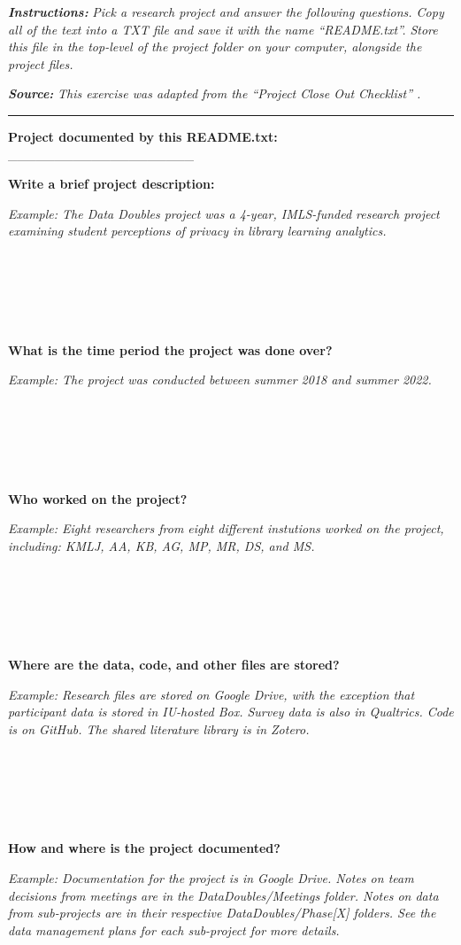 \documentclass[
]{book}
\begin{document}
\textbf{\emph{Instructions:}} \emph{Pick a research project and answer the following questions. Copy all of the text into a TXT file and save it with the name ``README.txt''. Store this file in the top-level of the project folder on your computer, alongside the project files.}

\textbf{\emph{Source:}} \emph{This exercise was adapted from the ``Project Close Out Checklist'' \citep{briney_project_2020}.}

\begin{center}\rule{0.5\linewidth}{0.5pt}\end{center}

\textbf{Project documented by this README.txt:} \_\_\_\_\_\_\_\_\_\_\_\_\_\_\_\_\_\_\_\_

\textbf{Write a brief project description:}

\emph{Example: The Data Doubles project was a 4-year, IMLS-funded research project examining student perceptions of privacy in library learning analytics.}

~

~

~

\textbf{What is the time period the project was done over?}

\emph{Example: The project was conducted between summer 2018 and summer 2022.}

~

~

~

\textbf{Who worked on the project?}

\emph{Example: Eight researchers from eight different instutions worked on the project, including: KMLJ, AA, KB, AG, MP, MR, DS, and MS.}

~

~

~

\textbf{Where are the data, code, and other files are stored?}

\emph{Example: Research files are stored on Google Drive, with the exception that participant data is stored in IU-hosted Box. Survey data is also in Qualtrics. Code is on GitHub. The shared literature library is in Zotero.}

~

~

~

\textbf{How and where is the project documented?}

\emph{Example: Documentation for the project is in Google Drive. Notes on team decisions from meetings are in the DataDoubles/Meetings folder. Notes on data from sub-projects are in their respective DataDoubles/Phase{[}X{]} folders. See the data management plans for each sub-project for more details.}
\end{document}
